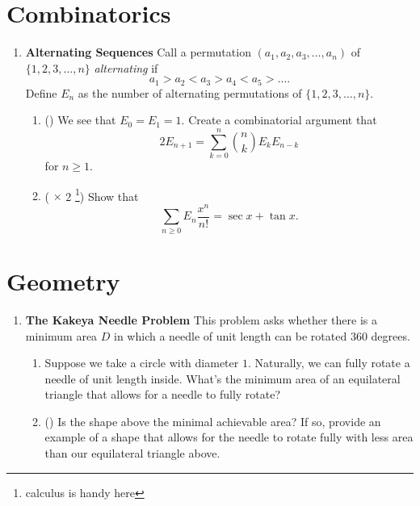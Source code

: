 \documentclass[11pt]{scrartcl}
\begin{document}
\newpage
\section{Combinatorics}
\begin{enumerate}[label=\textbf{C\arabic*}.]
    \item \textbf{Alternating Sequences} \newline
    Call a permutation $(a_1, a_2, a_3, \dots, a_n)$ of $\{1, 2, 3, \dots, n\}$ \textit{alternating} if
    \[ a_1 > a_2 < a_3 > a_4 < a_5 > \dots. \]
    Define $E_n$ as the number of alternating permutations of $\{1, 2, 3, \dots, n\}$.
    
    \begin{enumerate}
        \item (\fullchili) We see that $E_0 = E_1 = 1$. Create a combinatorial argument that
        \[ 2E_{n+1} = \sum_{k=0}^n \binom{n}{k} E_k E_{n-k} \]
        for $n \geq 1$.
        
        \item (\fullchili \hspace{1pt} $\times$ 2 \footnote{calculus is handy here}) Show that
        \[ \sum_{n \geq 0} E_n \frac{x^n}{n!} = \sec{x} + \tan{x}. \]
    \end{enumerate}
\end{enumerate}

\newpage
\section{Geometry}
\begin{enumerate}[label=\textbf{G\arabic*}.]
    \item \textbf{The Kakeya Needle Problem} \newline
    This problem asks whether there is a minimum area $D$ in which a needle of unit length can be rotated $360$ degrees. 
    
    \begin{enumerate}
        \item Suppose we take a circle with diameter $1$. Naturally, we can fully rotate a needle of unit length inside. What's the minimum area of an equilateral triangle that allows for a needle to fully rotate?
        
        \item (\halfchili) Is the shape above the minimal achievable area? If so, provide an example of a shape that allows for the needle to rotate fully with less area than our equilateral triangle above.
    \end{enumerate}
    
\end{enumerate}
\end{document}
